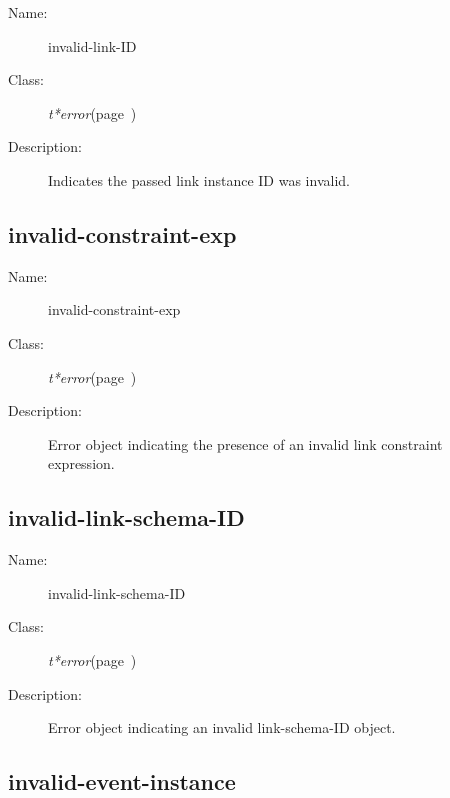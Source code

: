 \begin{description}
\item [Name:]  invalid-link-ID

\item [Class:] {\sl t*error}\hfill(page~\pageref{t*error})

\item [Description:]

Indicates the passed link instance ID was invalid.


\end{description}
\horizontalline

\subsection{invalid-constraint-exp}
\label{invalid-constraint-exp}

\begin{description}
\item [Name:]  invalid-constraint-exp

\item [Class:]
{\sl t*error}\hfill(page~\pageref{t*error})


\item [Description:]

Error object indicating the presence of an 
invalid link constraint expression.

\end{description}
\horizontalline

\subsection{invalid-link-schema-ID}
\label{invalid-link-schema-ID}

\begin{description}
\item [Name:]  invalid-link-schema-ID

\item [Class:] {\sl t*error}\hfill(page~\pageref{t*error})

\item [Description:]

Error object indicating an invalid link-schema-ID 
object.


\end{description}
\horizontalline

\subsection{invalid-event-instance}
\label{invalid-event-instance}

